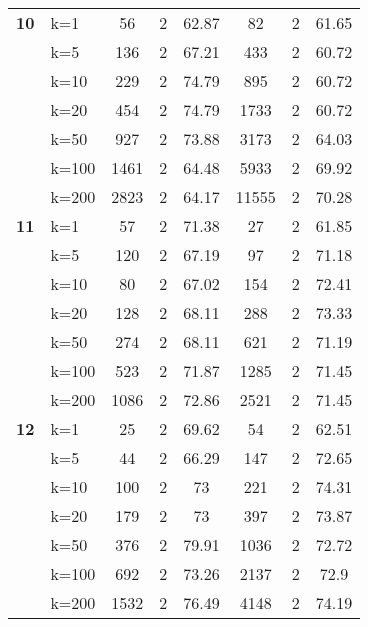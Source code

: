 \begin{table}[htbp]
\begin{tabular}{ll|ccc|ccc}
    \multicolumn{1}{r}{\textbf{10}} & k=1 & 56 & 2 & 62.87 & 82 & 2 & 61.65 \\ 
     & k=5 & 136 & 2 & 67.21 & 433 & 2 & 60.72 \\ 
     & k=10 & 229 & 2 & 74.79 & 895 & 2 & 60.72 \\ 
     & k=20 & 454 & 2 & 74.79 & 1733 & 2 & 60.72 \\ 
     & k=50 & 927 & 2 & 73.88 & 3173 & 2 & 64.03 \\ 
     & k=100 & 1461 & 2 & 64.48 & 5933 & 2 & 69.92 \\ 
     & k=200 & 2823 & 2 & 64.17 & 11555 & 2 & 70.28 \\ \hline
    \multicolumn{1}{r}{\textbf{11}} & k=1 & 57 & 2 & 71.38 & 27 & 2 & 61.85 \\ 
     & k=5 & 120 & 2 & 67.19 & 97 & 2 & 71.18 \\ 
     & k=10 & 80 & 2 & 67.02 & 154 & 2 & 72.41 \\ 
     & k=20 & 128 & 2 & 68.11 & 288 & 2 & 73.33 \\ 
     & k=50 & 274 & 2 & 68.11 & 621 & 2 & 71.19 \\ 
     & k=100 & 523 & 2 & 71.87 & 1285 & 2 & 71.45 \\ 
     & k=200 & 1086 & 2 & 72.86 & 2521 & 2 & 71.45 \\ \hline
    \multicolumn{1}{r}{\textbf{12}} & k=1 & 25 & 2 & 69.62 & 54 & 2 & 62.51 \\ 
     & k=5 & 44 & 2 & 66.29 & 147 & 2 & 72.65 \\ 
     & k=10 & 100 & 2 & 73 & 221 & 2 & 74.31 \\ 
     & k=20 & 179 & 2 & 73 & 397 & 2 & 73.87 \\ 
     & k=50 & 376 & 2 & 79.91 & 1036 & 2 & 72.72 \\ 
     & k=100 & 692 & 2 & 73.26 & 2137 & 2 & 72.9 \\ 
     & k=200 & 1532 & 2 & 76.49 & 4148 & 2 & 74.19 \\ \hline
    \end{tabular}
    \label{use_case_2}
    \end{table}
    